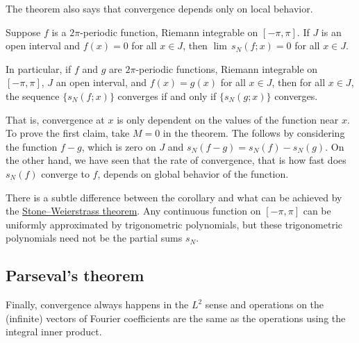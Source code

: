 The theorem also says that convergence depends only on local behavior.

\begin{cor}
Suppose $f$ is a $2\pi$-periodic function, Riemann integrable on $[-\pi,\pi]$.
If $J$ is an open interval and $f(x) = 0$ for all $x \in J$,
then $\lim\, s_N(f;x) = 0$ for all $x \in J$.

In particular, if $f$ and $g$ are $2\pi$-periodic functions,
Riemann integrable on $[-\pi,\pi]$, $J$ an open interval, and $f(x) = g(x)$
for all $x \in J$, then for all $x \in J$,
the sequence
$\bigl\{ s_N(f;x) \bigr\}$ converges if and only if $\bigl\{ s_N(g;x) \bigr\}$ converges.
\end{cor}

That is, convergence at $x$ is only dependent on the values of the function
near $x$.  To prove the first claim, take $M=0$ in the theorem.
The  follows by considering the function $f-g$, which
is zero on $J$ and $s_N(f-g) = s_N(f) - s_N(g)$.
On the other hand, we have seen that the rate of convergence,
that is how fast does $s_N(f)$
converge to $f$, depends on global behavior of the function.

There is a subtle difference between the corollary and what can be
achieved by the \hyperref[thm:SWcomplex]{Stone--Weierstrass theorem}.
Any continuous function on $[-\pi,\pi]$ can be uniformly approximated
by trigonometric polynomials, but these trigonometric polynomials need
not be the partial sums $s_N$.

\subsection{Parseval's theorem}

Finally,
convergence always happens in the $L^2$ sense and
operations on the (infinite) vectors of
Fourier coefficients are the same as the operations using the integral
inner product.

